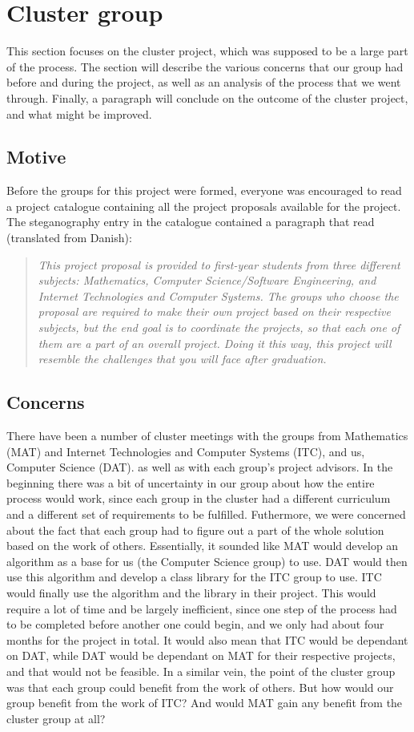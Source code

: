 \section{Cluster group}
This section focuses on the cluster project, which was supposed to be a large part of the process. The section will describe the various concerns that our group had before and during the project, as well as an analysis of the process that we went through. Finally, a paragraph will conclude on the outcome of the cluster project, and what might be improved.

\subsection{Motive}
Before the groups for this project were formed, everyone was encouraged to read a project catalogue containing all the project proposals available for the project.
The steganography entry in the catalogue contained a paragraph that read (translated from Danish):
\begin{quote}\textit{This project proposal is provided to first-year students from three different subjects: Mathematics, Computer Science/Software Engineering, and Internet Technologies and Computer Systems.
The groups who choose the proposal are required to make their own project based on their respective subjects, but the end goal is to coordinate the projects, so that each one of them are a part of an overall project.
Doing it this way, this project will resemble the challenges that you will face after graduation.}\end{quote}

\subsection{Concerns}
There have been a number of cluster meetings with the groups from Mathematics (MAT) and Internet Technologies and Computer Systems (ITC), and us, Computer Science (DAT). as well as with each group's project advisors.
In the beginning there was a bit of uncertainty in our group about how the entire process would work, since each group in the cluster had a different curriculum and a different set of requirements to be fulfilled.
Futhermore, we were concerned about the fact that each group had to figure out a part of the whole solution based on the work of others.
Essentially, it sounded like MAT would develop an algorithm as a base for us (the Computer Science group) to use.
DAT would then use this algorithm and develop a class library for the ITC group to use.
ITC would finally use the algorithm and the library in their project.
This would require a lot of time and be largely inefficient, since one step of the process had to be completed before another one could begin, and we only had about four months for the project in total.
It would also mean that ITC would be dependant on DAT, while DAT would be dependant on MAT for their respective projects, and that would not be feasible.
In a similar vein, the point of the cluster group was that each group could benefit from the work of others.
But how would our group benefit from the work of ITC? And would MAT gain any benefit from the cluster group at all?

